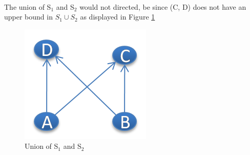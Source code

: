 \begin{figure}[htbp]
	\begin{center}
	\end{center}
\end{figure} \\
The union of S$_{1}$ and S$_{2}$ would not directed, be since (C, D) does not have an upper bound in $S_{1} \cup S_{2}$ as displayed in Figure \ref{img:ex1a:union}
\begin{figure}[htbp]
  \begin{center}
    \includegraphics{exercises/figures/exercise1a-union-S1-S2.png}
    \caption{Union of S$_{1}$ and S$_{2}$}
    \label{img:ex1a:union}
  \end{center}
\end{figure}

